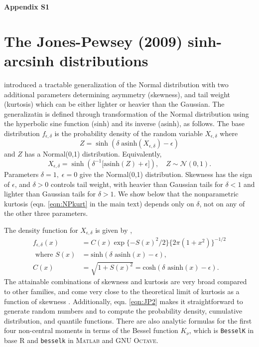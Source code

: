 \documentclass[12pt]{article}
\newcommand{\be}{\begin{equation}}
\newcommand{\ee}{\end{equation}}
\begin{document}
\newpage 
\clearpage 
\appendix



\begin{spacing}{1.35} 
	\linenumbers
	\centerline{\Large{\textbf{Appendix S1}}}
	\renewcommand{\thetable}{S-\arabic{table}}
	\renewcommand{\thefigure}{S-\arabic{figure}}
	\renewcommand{\thesection}{S.\arabic{section}}
	\renewcommand{\theequation}{S\arabic{equation}}
	\setcounter{page}{1}
	\setcounter{equation}{0}
	\setcounter{figure}{0}
	\setcounter{section}{0}
	\setcounter{table}{0}
	\section{The Jones-Pewsey (2009) sinh-arcsinh distributions}
	\citet{jones-pewsey-2009} introduced a tractable generalization of the Normal distribution with two 
	additional parameters determining asymmetry (skewness), and tail weight (kurtosis) which can be either 
	lighter or heavier than the Gaussian. The generalizatin is defined through transformation of the
	Normal distribution using the hyperbolic sine function (sinh) and its inverse (asinh), 
	as follows. The base distribution $f_{\epsilon,\delta}$  is the 
	probability density of the random variable $X_{\epsilon,\delta}$ where  
	\be
	Z = \sinh (\delta \; \mbox{asinh}(X_{\epsilon,\delta}) - \epsilon)
	\label{eqn:JP1}
	\ee
	and $Z$ has a Normal(0,1) distribution. Equivalently, 
	\be
	X_{\epsilon,\delta} = \sinh \left( \delta^{-1} \big[\mbox{asinh}(Z) + \epsilon \big] \right), \quad Z \sim \mathcal{N}(0,1).
	\label{eqn:JP2}
	\ee
	Parameters $\delta=1, \; \epsilon=0$ give the Normal(0,1) distribution. Skewness has the sign of $\epsilon$, and
	$\delta > 0$ controls tail weight, with heavier than Gaussian tails for $\delta<1$ and lighter than Gaussian tails for $\delta > 1$. We show below that the nonparametric kurtosis (eqn. \eqref{eqn:NPkurt} in the main text) depends 
	only on $\delta$, not on any of the other three parameters. 
	
	The density function for $X_{\epsilon,\delta}$ is given by \citet[][eqn. 2]{jones-pewsey-2009}, 
	\be
	\begin{aligned}
		f_{ \epsilon,\delta}(x) & = C(x) \exp\{-S(x)^2/2\} \{2\pi(1+x^2)\}^{-1/2}  \\
		\mbox{ where }  S(x) & =  \mbox{sinh}(\delta \mbox{ asinh}(x)- \epsilon), \\
		C(x)  & =  \sqrt{1 + S(x)^2} = \mbox{cosh}(\delta \mbox{ asinh}(x)- \epsilon).
	\end{aligned} 
	\ee
	The attainable combinations of skewness and kurtosis are 
	very broad compared to other families, and come very close to the theoretical limit of
	kurtosis as a function of skewness \citep[][Fig.  2]{jones-pewsey-2009}. 
	Additionally, eqn. \eqref{eqn:JP2} makes it straightforward to generate random numbers and to compute 
	the probability density, cumulative distribution, and quantile functions. 
	There are also analytic formulas for the first four non-central 
	moments \citep[][p. 764]{jones-pewsey-2009} in terms of the Bessel function $K_{\nu}$, which is
	\texttt{BesselK} in base R and \texttt{besselk} in \textsc{Matlab} and GNU \textsc{Octave}.
	

\end{spacing}
\end{document}
